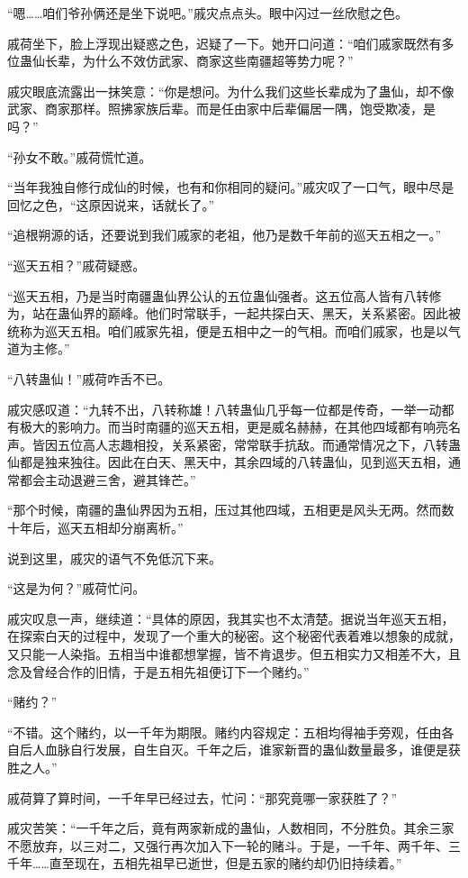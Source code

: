 \begin{this_body}
“嗯……咱们爷孙俩还是坐下说吧。”戚灾点点头。眼中闪过一丝欣慰之色。

戚荷坐下，脸上浮现出疑惑之色，迟疑了一下。她开口问道：“咱们戚家既然有多位蛊仙长辈，为什么不效仿武家、商家这些南疆超等势力呢？”

戚灾眼底流露出一抹笑意：“你是想问。为什么我们这些长辈成为了蛊仙，却不像武家、商家那样。照拂家族后辈。而是任由家中后辈偏居一隅，饱受欺凌，是吗？”

“孙女不敢。”戚荷慌忙道。

“当年我独自修行成仙的时候，也有和你相同的疑问。”戚灾叹了一口气，眼中尽是回忆之色，“这原因说来，话就长了。”

“追根朔源的话，还要说到我们戚家的老祖，他乃是数千年前的巡天五相之一。”

“巡天五相？”戚荷疑惑。

“巡天五相，乃是当时南疆蛊仙界公认的五位蛊仙强者。这五位高人皆有八转修为，站在蛊仙界的巅峰。他们时常联手，一起共探白天、黑天，关系紧密。因此被统称为巡天五相。咱们戚家先祖，便是五相中之一的气相。而咱们戚家，也是以气道为主修。”

“八转蛊仙！”戚荷咋舌不已。

戚灾感叹道：“九转不出，八转称雄！八转蛊仙几乎每一位都是传奇，一举一动都有极大的影响力。而当时南疆的巡天五相，更是威名赫赫，在其他四域都有响亮名声。皆因五位高人志趣相投，关系紧密，常常联手抗敌。而通常情况之下，八转蛊仙都是独来独往。因此在白天、黑天中，其余四域的八转蛊仙，见到巡天五相，通常都会主动退避三舍，避其锋芒。”

“那个时候，南疆的蛊仙界因为五相，压过其他四域，五相更是风头无两。然而数十年后，巡天五相却分崩离析。”

说到这里，戚灾的语气不免低沉下来。

“这是为何？”戚荷忙问。

戚灾叹息一声，继续道：“具体的原因，我其实也不太清楚。据说当年巡天五相，在探索白天的过程中，发现了一个重大的秘密。这个秘密代表着难以想象的成就，又只能一人染指。五相当中谁都想掌握，皆不肯退步。但五相实力又相差不大，且念及曾经合作的旧情，于是五相先祖便订下一个赌约。”

“赌约？”

“不错。这个赌约，以一千年为期限。赌约内容规定：五相均得袖手旁观，任由各自后人血脉自行发展，自生自灭。千年之后，谁家新晋的蛊仙数量最多，谁便是获胜之人。”

戚荷算了算时间，一千年早已经过去，忙问：“那究竟哪一家获胜了？”

戚灾苦笑：“一千年之后，竟有两家新成的蛊仙，人数相同，不分胜负。其余三家不愿放弃，以三对二，又强行再次加入下一轮的赌斗。于是，一千年、两千年、三千年……直至现在，五相先祖早已逝世，但是五家的赌约却仍旧持续着。”


\end{this_body}
